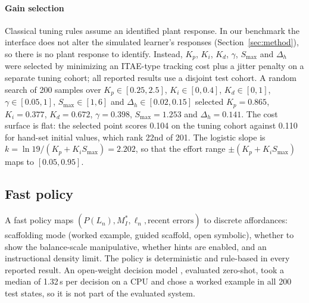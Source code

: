 \documentclass[conference]{IEEEtran}
\begin{document}
\paragraph*{Gain selection}
Classical tuning rules \cite{ziegler1942optimum,skogestad2003simple}
assume an identified plant response. In our benchmark the interface does not
alter the simulated learner's responses (Section~\ref{sec:method}), so there is
no plant response to identify. Instead, $K_p$, $K_i$, $K_d$, $\gamma$,
$S_{\max}$ and $\Delta_h$ were selected by minimizing an ITAE-type tracking
cost \cite{graham1953itae} plus a jitter penalty on a separate tuning cohort;
all reported results use a disjoint test cohort. A random search of 200
samples over $K_p\in[0.25,2.5]$, $K_i\in[0,0.4]$, $K_d\in[0,1]$,
$\gamma\in[0.05,1]$, $S_{\max}\in[1,6]$ and $\Delta_h\in[0.02,0.15]$ selected
$K_p=0.865$, $K_i=0.377$, $K_d=0.672$, $\gamma=0.398$, $S_{\max}=1.253$ and
$\Delta_h=0.141$. The cost surface is flat: the selected point scores 0.104
on the tuning cohort against 0.110 for hand-set initial values, which rank
22nd of 201. The logistic slope is $k=\ln 19/(K_p+K_iS_{\max})=2.202$, so
that the effort range $\pm(K_p+K_iS_{\max})$ maps to $[0.05,0.95]$.

\subsection{Fast policy}
A fast policy maps $(P(L_n), M_I^*, \ell_n, \text{recent errors})$ to discrete
affordances: scaffolding mode (worked example, guided scaffold, open
symbolic), whether to show the balance-scale manipulative, whether hints are
enabled, and an instructional density limit. The policy is deterministic
and rule-based in every reported result. An open-weight decision model
\cite{laya2026}, evaluated zero-shot, took a median of 1.32\,s per decision
on a CPU and chose a worked example in all 200 test states, so it is not
part of the evaluated system.
\end{document}
